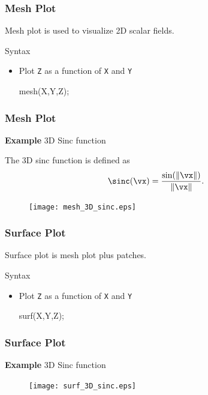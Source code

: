 \documentclass[compress]{beamer}  %
\begin{document}
\begin{frame}[fragile]
\frametitle{Mesh Plot}
Mesh plot is used to visualize 2D scalar fields.
\begin{block}{Syntax}
\begin{itemize}
    \item Plot \texttt{Z} as a function of \texttt{X} and \texttt{Y}
          \begin{matlabcodebeamer}[numbers=none,frame=none]
          mesh(X,Y,Z);
          \end{matlabcodebeamer}
\end{itemize}
\end{block}

\end{frame}
\begin{frame}[fragile]
\frametitle{Mesh Plot}
\textbf{Example} 3D Sinc function

The 3D sinc function is defined as
\begin{equation}
    \sinc(\vx) = \frac{\sin(\| \vx \|)}{\| \vx \|}.
\end{equation}\pause

\setcounter{subfigure}{0}
\begin{figure}
    \centering
    \texttt{[image: mesh\_3D\_sinc.eps]}
\end{figure}

\end{frame}
\begin{frame}[fragile]
\frametitle{Surface Plot}
Surface plot is mesh plot plus patches.
\begin{block}{Syntax}
\begin{itemize}
    \item Plot \texttt{Z} as a function of \texttt{X} and \texttt{Y}
          \begin{matlabcodebeamer}[numbers=none,frame=none]
          surf(X,Y,Z);
          \end{matlabcodebeamer}
\end{itemize}
\end{block}

\end{frame}
\begin{frame}[fragile]
\frametitle{Surface Plot}
\textbf{Example} 3D Sinc function

\setcounter{subfigure}{0}
\begin{figure}
    \centering
    \texttt{[image: surf\_3D\_sinc.eps]}
\end{figure}

\end{frame}
\end{document}
